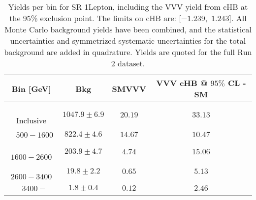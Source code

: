 \begin{table}[!htbp]
    \small
    \center
    \begin{tabular}{c||c|c|c}
    Bin [GeV] & Bkg & SMVVV & \pbox{20cm}{VVV \\ cHB @ $95\%$ CL - SM \\ }\\
    \hline
    \pbox{20cm}{ ~ \\Inclusive\\ } & $1047.9 \pm 6.9$ & $20.19$ & $33.13$\\
    \hline
    \pbox{20cm}{ ~ \\$500-1600$\\ } & $822.4 \pm 4.6$ & $14.67$ & $10.47$\\
    \hline
    \pbox{20cm}{ ~ \\$1600-2600$\\ } & $203.9 \pm 4.7$ & $4.74$ & $15.06$\\
    \hline
    \pbox{20cm}{ ~ \\$2600-3400$\\ } & $19.8 \pm 2.2$ & $0.65$ & $5.13$\\
    \hline
    \pbox{20cm}{ ~ \\$3400-$\\ } & $1.8 \pm 0.4$ & $0.12$ & $2.46$\\
\end{tabular}
    \caption{Yields per bin for SR 1Lepton, including the VVV yield from cHB at the $95$\% exclusion point. The limits on cHB are: [$-1.239$,~$1.243$]. All Monte Carlo background yields have been combined, and the statistical uncertainties and symmetrized systematic uncertainties for the total background are added in quadrature. Yields are quoted for the full Run 2 dataset.}
    \label{tab:1Lepton$binssignal}
\end{table}
